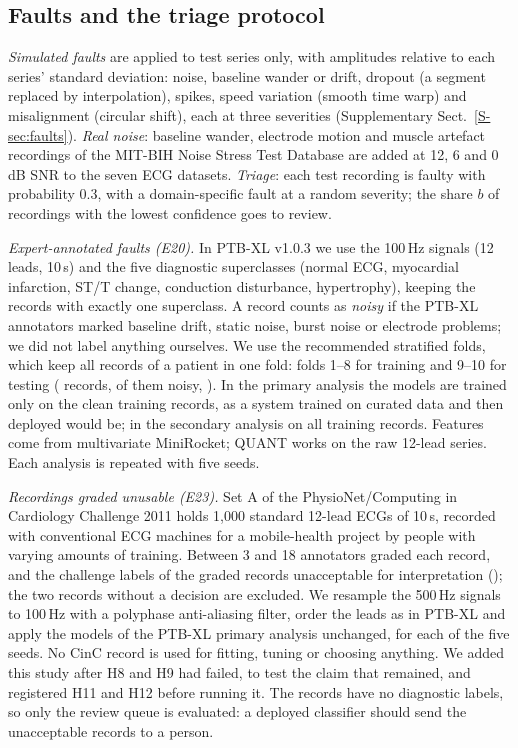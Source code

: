 \documentclass[preprint,12pt,authoryear]{elsarticle}
\begin{document}
\subsection{Faults and the triage protocol}\label{sec:faultsetup}
\emph{Simulated faults} are applied to test series only, with amplitudes relative to each series' standard deviation: noise, baseline wander or drift, dropout (a segment replaced by interpolation), spikes, speed variation (smooth time warp) and misalignment (circular shift), each at three severities (Supplementary Sect.~\ref{S-sec:faults}). \emph{Real noise}: baseline wander, electrode motion and muscle artefact recordings of the MIT-BIH Noise Stress Test Database \citep{goldberger2000physionet,moody1984nstdb} are added at 12, 6 and 0\,dB SNR to the seven ECG datasets. \emph{Triage}: each test recording is faulty with probability 0.3, with a domain-specific fault at a random severity; the share $b$ of recordings with the lowest confidence goes to review.

\emph{Expert-annotated faults (E20).} In PTB-XL v1.0.3 \citep{wagner2020ptbxl} we use the 100\,Hz signals (12 leads, 10\,s) and the five diagnostic superclasses (normal ECG, myocardial infarction, ST/T change, conduction disturbance, hypertrophy), keeping the \PTBN{} records with exactly one superclass. A record counts as \emph{noisy} if the PTB-XL annotators marked baseline drift, static noise, burst noise or electrode problems; we did not label anything ourselves. We use the recommended stratified folds, which keep all records of a patient in one fold: folds 1--8 for training and 9--10 for testing (\PTBTest{} records, \PTBTestNoisy{} of them noisy, \PTBNoisyShareTest). In the primary analysis the models are trained only on the \PTBTrainClean{} clean training records, as a system trained on curated data and then deployed would be; in the secondary analysis on all \PTBTrainAll{} training records. Features come from multivariate MiniRocket; QUANT works on the raw 12-lead series. Each analysis is repeated with five seeds.

\emph{Recordings graded unusable (E23).} Set A of the PhysioNet/Computing in Cardiology Challenge 2011 \citep{silva2011challenge,goldberger2000physionet} holds 1{,}000 standard 12-lead ECGs of 10\,s, recorded with conventional ECG machines for a mobile-health project by people with varying amounts of training. Between 3 and 18 annotators graded each record, and the challenge labels \CincUnacc{} of the \CincN{} graded records unacceptable for interpretation (\CincUnaccShare); the two records without a decision are excluded. We resample the 500\,Hz signals to 100\,Hz with a polyphase anti-aliasing filter, order the leads as in PTB-XL and apply the models of the PTB-XL primary analysis unchanged, for each of the five seeds. No CinC record is used for fitting, tuning or choosing anything. We added this study after H8 and H9 had failed, to test the claim that remained, and registered H11 and H12 before running it. The records have no diagnostic labels, so only the review queue is evaluated: a deployed classifier should send the unacceptable records to a person.
\end{document}
